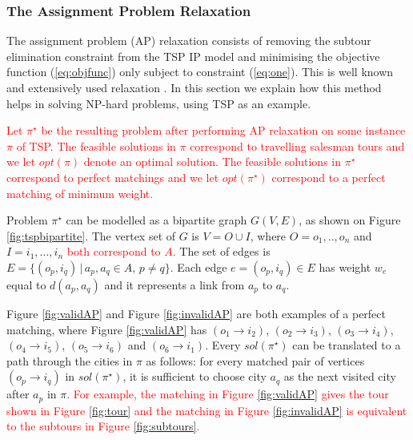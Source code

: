 \documentclass{mprop}
\theoremstyle{definition}
\begin{document}
\subsubsection{The Assignment Problem Relaxation}

The assignment problem (AP) relaxation consists of removing the subtour elimination constraint from the TSP IP model and minimising the objective function (\ref{eq:objfunc}) only subject to constraint (\ref{eq:one}). This is well known and extensively used relaxation \cite{Little63,Eastman58,Bellmore71,Baker83,Laporte86}. In this section we explain how this method helps in solving NP-hard problems, using TSP as an example.

\textcolor{red}{
Let $\pi^{\star}$ be the resulting problem after performing AP relaxation on some instance $\pi$ of TSP. 
The feasible solutions in $\pi$ correspond to travelling salesman tours and we let $opt(\pi)$ denote an optimal solution. The feasible solutions in $\pi^{\star}$ correspond to perfect matchings and we let $opt(\pi^{\star})$ correspond to a perfect matching of minimum weight.
}

Problem $\pi^{\star}$ can be modelled as a bipartite graph $G(V,E)$, as shown on Figure \ref{fig:tspbipartite}. The vertex set of $G$ is $V=O \cup I$, where $O = o_{1},..,o_{n}$ and $I = i_{1},...,i_{n}$ \textcolor{red}{both correspond to $A$.} The set of edges is $E = \{(o_{p}, i_{q}) \,|\, a_{p},a_{q} \in A,\, p \neq q \}$. Each edge $e = (o_{p}, i_{q}) \in E$ has weight $w_{e}$ equal to $d(a_{p},a_{q})$ and it represents a link from $a_{p}$ to $a_{q}$.

Figure \ref{fig:validAP} and Figure \ref{fig:invalidAP} are both examples of a perfect matching, where Figure \ref{fig:validAP} has $(o_{1} \rightarrow i_{2})$, $(o_{2} \rightarrow i_{3})$, $(o_{3} \rightarrow i_{4})$, $(o_{4} \rightarrow i_{5})$, $(o_{5} \rightarrow i_{6})$ and $(o_{6} \rightarrow i_{1})$.
Every $sol(\pi^{\star})$ can be translated to a path through the cities in $\pi$ as follows: for every matched pair of vertices $(o_{p} \rightarrow i_{q})$ in $sol(\pi^{\star})$, it is sufficient to choose city $a_{q}$ as the next visited city after $a_{p}$ in $\pi$. \textcolor{red}{For example, the matching in Figure \ref{fig:validAP} gives the tour shown in Figure \ref{fig:tour} and the matching in Figure \ref{fig:invalidAP} is equivalent to the subtours in Figure \ref{fig:subtours}.
}
\end{document}
